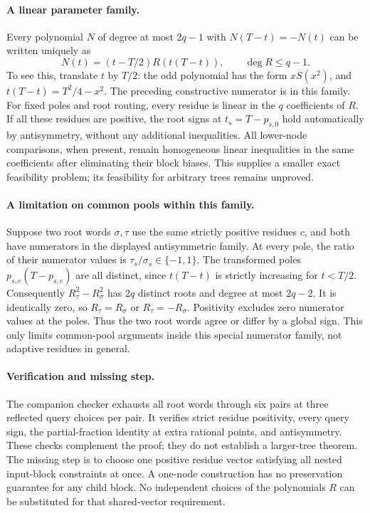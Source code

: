 \documentclass[11pt]{article}
\begin{document}
\paragraph{A linear parameter family.}
Every polynomial $N$ of degree at most $2q-1$ with
$N(T-t)=-N(t)$ can be written uniquely as
\[
 N(t)=(t-T/2)R(t(T-t)),\qquad \deg R\leq q-1.
\]
To see this, translate $t$ by $T/2$: the odd polynomial has the form
$xS(x^2)$, and $t(T-t)=T^2/4-x^2$. The preceding constructive
numerator is in this family. For fixed poles and root routing, every
residue is linear in the $q$ coefficients of $R$.
If all these residues are positive, the root signs at
$t_s=T-p_{s,0}$ hold automatically by antisymmetry, without any
additional inequalities. All lower-node comparisons, when present,
remain homogeneous linear inequalities in the same coefficients after
eliminating their block biases. This supplies a smaller exact feasibility
problem; its feasibility for arbitrary trees remains unproved.

\paragraph{A limitation on common pools within this family.}
Suppose two root words $\sigma,\tau$ use the same strictly positive
residues $c$, and both have numerators in the displayed antisymmetric
family. At every pole, the ratio of their numerator values is
$\tau_s/\sigma_s\in\{-1,1\}$. The transformed poles
$p_{s,e}(T-p_{s,e})$ are all distinct, since $t(T-t)$ is strictly
increasing for $t<T/2$. Consequently $R_\tau^2-R_\sigma^2$ has
$2q$ distinct roots and degree at most $2q-2$. It is identically zero,
so $R_\tau=R_\sigma$ or $R_\tau=-R_\sigma$. Positivity excludes
zero numerator values at the poles. Thus the two root words agree
or differ by a global sign. This only limits common-pool arguments
inside this special numerator family, not adaptive residues in general.

\paragraph{Verification and missing step.}
The companion checker exhausts all root words through six pairs at
three reflected query choices per pair. It verifies strict residue
positivity, every query sign, the partial-fraction identity at extra
rational points, and antisymmetry. These checks complement the proof;
they do not establish a larger-tree theorem.
The missing step is to choose one positive residue vector satisfying
all nested input-block constraints at once. A one-node construction
has no preservation guarantee for any child block. No independent
choices of the polynomials $R$ can be substituted for that shared-vector
requirement.
\end{document}
